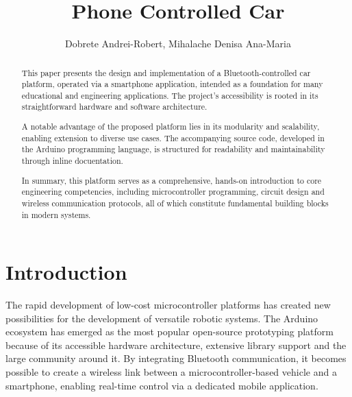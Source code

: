 \documentclass[
 fontsize  = 11,                 %
%
 imagesupport = true, %
 tablesupport = true, %
 urlsupport   = true, %
%
 docstyleTitleStyle         = scientificpaper %
%
]{my_style}
\title{Phone Controlled Car}
\author{Dobrete Andrei-Robert, Mihalache Denisa Ana-Maria}
\begin{document}
 \maketitle       %

 \begin{abstract}
  This paper presents the design and implementation of a Bluetooth-controlled car platform, operated via a smartphone application, intended as a foundation for many educational and engineering applications.
  The project's accessibility is rooted in its straightforward hardware and software architecture.

  A notable advantage of the proposed platform lies in its modularity and scalability, enabling extension to diverse use cases. The accompanying source code, developed in the Arduino programming language, is structured for readability and maintainability through inline docuentation.

  In summary, this platform serves as a comprehensive, hands-on introduction to core engineering competencies, including microcontroller programming, circuit design and wireless communication protocols, all of which constitute fundamental building blocks in modern systems.
 \end{abstract}

 \tableofcontents %

 \chapter{Introduction}
 The rapid development of low-cost microcontroller platforms has created new possibilities for the development of versatile robotic systems.
 The Arduino ecosystem has emerged as the most popular open-source prototyping platform because of its accessible hardware architecture, extensive library support and the large community around it.
 By integrating Bluetooth communication, it becomes possible to create a wireless link between a microcontroller-based vehicle and a smartphone, enabling real-time control via a dedicated mobile application.
\end{document}
